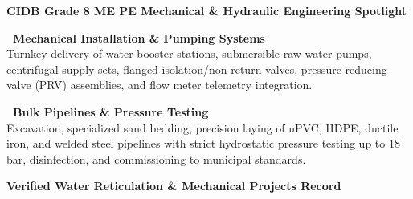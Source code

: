 \documentclass[a4paper,11pt]{article}
\begin{document}
\vfill

{\large\bfseries\color{mhnavy} CIDB Grade 8 ME PE Mechanical \& Hydraulic Engineering Spotlight}
\vspace{0.12cm}

\noindent
\begin{minipage}[t]{0.485\textwidth}
    \begin{tcolorbox}[
        enhanced, colback=mhoffwhite, colframe=mhnavy, boxrule=0.8pt, arc=4pt,
        left=8pt, right=8pt, top=6pt, bottom=6pt, drop shadow=black!3
    ]
        {\fontsize{8.6pt}{10.8pt}\selectfont\bfseries\color{mhnavy}\faCogs\ Mechanical Installation \& Pumping Systems}\\[2.5pt]
        {\fontsize{8.0pt}{10.8pt}\selectfont\color{mhtext}
        Turnkey delivery of water booster stations, submersible raw water pumps, centrifugal supply sets, flanged isolation/non-return valves, pressure reducing valve (PRV) assemblies, and flow meter telemetry integration.
        }
    \end{tcolorbox}
\end{minipage}
\hfill
\begin{minipage}[t]{0.485\textwidth}
    \begin{tcolorbox}[
        enhanced, colback=mhoffwhite, colframe=mhblue, boxrule=0.8pt, arc=4pt,
        left=8pt, right=8pt, top=6pt, bottom=6pt, drop shadow=black!3
    ]
        {\fontsize{8.6pt}{10.8pt}\selectfont\bfseries\color{mhnavy}\faTint\ Bulk Pipelines \& Pressure Testing}\\[2.5pt]
        {\fontsize{8.0pt}{10.8pt}\selectfont\color{mhtext}
        Excavation, specialized sand bedding, precision laying of uPVC, HDPE, ductile iron, and welded steel pipelines with strict hydrostatic pressure testing up to 18 bar, disinfection, and commissioning to municipal standards.
        }
    \end{tcolorbox}
\end{minipage}

\vfill

{\large\bfseries\color{mhnavy} Verified Water Reticulation \& Mechanical Projects Record}
\vspace{0.12cm}
\end{document}
